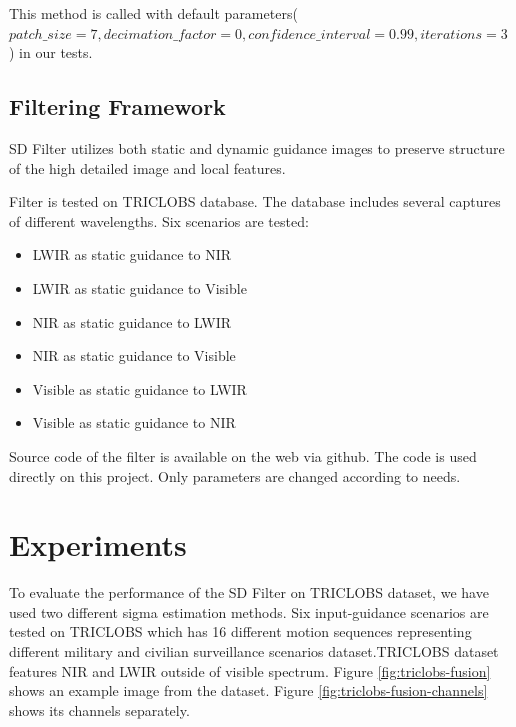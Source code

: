 \documentclass[10pt,twocolumn,letterpaper]{article}
\begin{document}
This method is called with default parameters(\(patch\_size=7, decimation\_factor=0, confidence\_interval=0.99, iterations=3\)) in our tests.
\subsection{Filtering Framework}\label{ss:filter-framework}
SD Filter\cite{ham2015robust} utilizes both static and dynamic guidance images to preserve structure of the high detailed image and local features.

Filter is tested on TRICLOBS\cite{triclobs} database. The database includes several captures of different wavelengths. Six scenarios are tested:
\begin{itemize}
	\item LWIR as static guidance to NIR
	\item LWIR as static guidance to Visible
	\item NIR as static guidance to LWIR
	\item NIR as static guidance to Visible
	\item Visible as static guidance to LWIR
	\item Visible as static guidance to NIR
\end{itemize}

Source code of the filter is available on the web via github\cite{github:sdfilter}. The code is used directly on this project. Only parameters are changed according to needs.

\section{Experiments}

To evaluate the performance of the SD Filter\cite{ham2015robust} on TRICLOBS\cite{triclobs} dataset, we have used two different sigma estimation methods. Six input-guidance scenarios are tested on TRICLOBS which has  16 different motion sequences representing different military and civilian surveillance scenarios dataset.TRICLOBS dataset features NIR and LWIR outside of visible spectrum. Figure \ref{fig:triclobs-fusion} shows an example image from the dataset. Figure \ref{fig:triclobs-fusion-channels} shows its channels separately.
\end{document}
